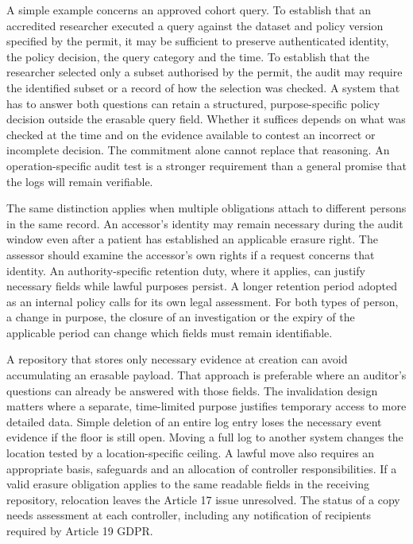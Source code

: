 \documentclass[5p,twocolumn]{elsarticle}
\begin{document}
A simple example concerns an approved cohort query. To establish that an
accredited researcher executed a query against the dataset and policy
version specified by the permit, it may be sufficient to preserve
authenticated identity, the policy decision, the query category and the
time. To establish that the researcher selected only a subset authorised
by the permit, the audit may require the identified subset or a record
of how the selection was checked. A system that has to answer both
questions can retain a structured, purpose-specific policy decision
outside the erasable query field. Whether it suffices depends on what
was checked at the time and on the evidence available to contest an
incorrect or incomplete decision. The commitment alone cannot replace
that reasoning. An operation-specific audit test is a stronger
requirement than a general promise that the logs will remain verifiable.

The same distinction applies when multiple obligations attach to
different persons in the same record. An accessor's identity may remain
necessary during the audit window even after a patient has established
an applicable erasure right. The assessor should examine the accessor's
own rights if a request concerns that identity. An authority-specific
retention duty, where it applies, can justify necessary fields while
lawful purposes persist. A longer retention period adopted as an
internal policy calls for its own legal assessment. For both types of
person, a change in purpose, the closure of an investigation or the
expiry of the applicable period can change which fields must remain
identifiable.

A repository that stores only necessary evidence at creation can avoid
accumulating an erasable payload. That approach is preferable where an
auditor's questions can already be answered with those fields. The
invalidation design matters where a separate, time-limited purpose
justifies temporary access to more detailed data. Simple deletion of an
entire log entry loses the necessary event evidence if the floor is
still open. Moving a full log to another system changes the location
tested by a location-specific ceiling. A lawful move also requires an
appropriate basis, safeguards and an allocation of controller
responsibilities. If a valid erasure obligation applies to the same
readable fields in the receiving repository, relocation leaves the
Article 17 issue unresolved. The status of a copy needs assessment at
each controller, including any notification of recipients required by
Article 19 GDPR.
\end{document}
